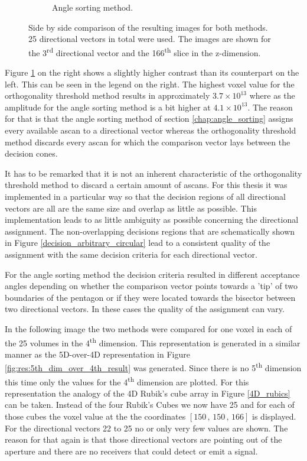 \begin{figure}[H]
\begin{subfigure}[b]{0.49\textwidth}
         \caption{Angle sorting method.}
         \label{fig:res:slice_diff_bubble_ortho_imagebubble}
     \end{subfigure}
        \caption{Side by side comparison of the resulting images for both methods. 25 directional vectors in total were used. The images are shown for the 3\textsuperscript{rd} directional vector and the 166\textsuperscript{th} slice in the z-dimension.}
        \label{fig:res:slice_diff_bubble_ortho_image}
\end{figure}


Figure \ref{fig:res:slice_diff_bubble_ortho_imagebubble} on the right shows a slightly higher contrast than its counterpart on the left. This can be seen in the legend on the right. The highest voxel value for the orthogonality threshold method results in approximately $3.7\times 10^{13}$ where as the amplitude for the angle sorting method is a bit higher at $4.1\times 10^{13}$. The reason for that is that the angle sorting method of section \ref{chap:angle_sorting} assigns every available \ac{ascan} to a directional vector whereas the orthogonality threshold method discards every \ac{ascan} for which the comparison vector lays between the decision cones. 

It has to be remarked that it is not an inherent characteristic of the orthogonality threshold method to discard a certain amount of \acp{ascan}. For this thesis it was implemented in a particular way so that the decision regions of all directional vectors are all are the same size and overlap as little as possible. This implementation leads to as little ambiguity as possible concerning the directional assignment. The non-overlapping decisions regions that are schematically shown in Figure \ref{decision_arbitrary_circular} lead to a consistent quality of the assignment with the same decision criteria for each directional vector. 

For the angle sorting method the decision criteria resulted in different acceptance angles depending on whether the comparison vector points towards a 'tip' of two boundaries of the pentagon or if they were located towards the bisector between two directional vectors. In these cases the quality of the assignment can vary.

\bigskip

In the following image the two methods were compared for one voxel in each of the 25 volumes in the 4\textsuperscript{th} dimension. This representation is generated in a similar manner as the 5D-over-4D representation in Figure \ref{fig:res:5th_dim_over_4th_result} was generated. Since there is no 5\textsuperscript{th} dimension this time only the values for the 4\textsuperscript{th} dimension are plotted. For this representation the analogy of the 4D Rubik's cube array in Figure \ref{4D_rubics} can be taken. Instead of the four Rubik's Cubes we now have 25 and for each of those cubes the voxel value at the the coordinates $[150\, , \, 150\, , \, 166]$ is displayed. For the directional vectors 22 to 25 no or only very few values are shown. The reason for that again is that those directional vectors are pointing out of the aperture and there are no receivers that could detect or emit a signal. 


